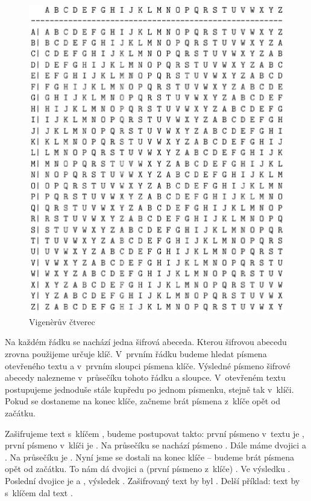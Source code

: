\documentclass[12pt]{article}
\theoremstyle{definition}
\begin{document}
\begin{figure}[h]
  \begin{center}
  \includegraphics[scale=0.75]{images/recta.eps}
  \end{center}
\caption{Vigenèrův čtverec}
\label{img_recta}
\end{figure}

Na každém řádku se nachází jedna šifrová abeceda. Kterou šifrovou abecedu zrovna použijeme určuje klíč. V~prvním řádku budeme hledat písmena otevřeného textu a v~prvním sloupci písmena klíče. Výsledné písmeno šifrové abecedy nalezneme v~průsečíku tohoto řádku a sloupce. V~otevřeném textu postupujeme jednoduše stále kupředu po jednom písmenku, stejně tak v~klíči. Pokud se dostaneme na konec klíče, začneme brát písmena z~klíče opět od začátku. 

Zašifrujeme text  s~klíčem , budeme postupovat takto: první písmeno v~textu je , první písmeno v~klíči je . Na průsečíku se nachází písmeno . Dále máme dvojici  a . Na průsečíku je . Nyní jsme se dostali na konec klíče -- budeme brát písmena opět od začátku. To nám dá dvojici  a (první písmeno z~klíče) . Ve výsledku . Poslední dvojice je  a , výsledek . Zašifrovaný text  by byl . Delší příklad: text  by s~klíčem  dal text .
\end{document}
